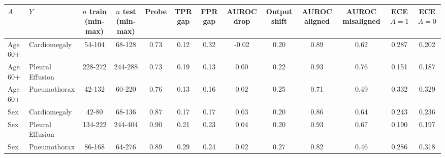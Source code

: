 \begin{tabular}{llccccccccccc}
\toprule
$A$ & $Y$ & $n$ train (min-max) & $n$ test (min-max) & Probe & TPR gap & FPR gap & AUROC drop & Output shift & AUROC aligned & AUROC misaligned & ECE $A{=}1$ & ECE $A{=}0$ \\
\midrule
Age 60+ & Cardiomegaly & 54-104 & 68-128 & 0.73 & 0.12 & 0.32 & -0.02 & 0.20 & 0.89 & 0.62 & 0.287 & 0.202 \\
Age 60+ & Pleural Effusion & 228-272 & 244-288 & 0.73 & 0.19 & 0.13 & 0.00 & 0.22 & 0.93 & 0.76 & 0.151 & 0.187 \\
Age 60+ & Pneumothorax & 42-132 & 60-220 & 0.76 & 0.13 & 0.16 & 0.02 & 0.25 & 0.71 & 0.49 & 0.332 & 0.329 \\
Sex & Cardiomegaly & 42-80 & 68-136 & 0.87 & 0.17 & 0.17 & 0.03 & 0.20 & 0.86 & 0.64 & 0.243 & 0.236 \\
Sex & Pleural Effusion & 134-222 & 244-404 & 0.90 & 0.21 & 0.23 & 0.04 & 0.20 & 0.93 & 0.67 & 0.190 & 0.197 \\
Sex & Pneumothorax & 86-168 & 64-276 & 0.89 & 0.29 & 0.24 & 0.02 & 0.27 & 0.82 & 0.46 & 0.286 & 0.318 \\
\bottomrule
\end{tabular}

